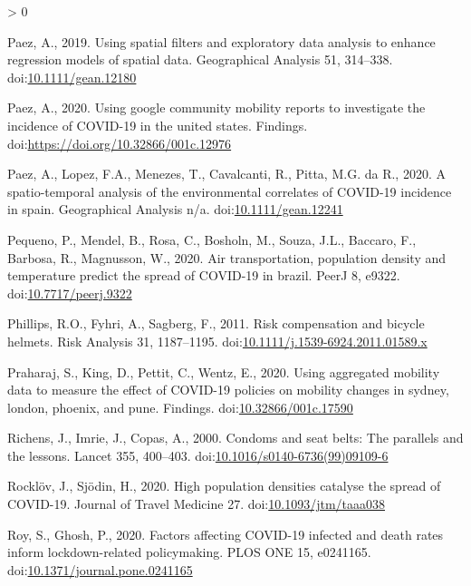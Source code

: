 \documentclass[]{elsarticle} %
\newlength{\cslhangindent}
\newenvironment{CSLReferences}[2] %
 {%
  \setlength{\parindent}{0pt}
  \ifodd #1 \everypar{\setlength{\hangindent}{\cslhangindent}}\ignorespaces\fi
  \ifnum #2 > 0
  \setlength{\parskip}{#2\baselineskip}
  \fi
 }%
 {}
\begin{document}
\begin{CSLReferences}{1}{0}
\leavevmode\hypertarget{ref-Paez2019using}{}%
Paez, A., 2019. Using spatial filters and exploratory data analysis to
enhance regression models of spatial data. Geographical Analysis 51,
314--338.
doi:\href{https://doi.org/10.1111/gean.12180}{10.1111/gean.12180}

\leavevmode\hypertarget{ref-Paez2020using}{}%
Paez, A., 2020. Using google community mobility reports to investigate
the incidence of COVID-19 in the united states. Findings.
doi:\url{https://doi.org/10.32866/001c.12976}

\leavevmode\hypertarget{ref-Paez2020spatio}{}%
Paez, A., Lopez, F.A., Menezes, T., Cavalcanti, R., Pitta, M.G. da R.,
2020. A spatio-temporal analysis of the environmental correlates of
COVID-19 incidence in spain. Geographical Analysis n/a.
doi:\href{https://doi.org/10.1111/gean.12241}{10.1111/gean.12241}

\leavevmode\hypertarget{ref-Pequeno2020air}{}%
Pequeno, P., Mendel, B., Rosa, C., Bosholn, M., Souza, J.L., Baccaro,
F., Barbosa, R., Magnusson, W., 2020. Air transportation, population
density and temperature predict the spread of COVID-19 in brazil. PeerJ
8, e9322.
doi:\href{https://doi.org/10.7717/peerj.9322}{10.7717/peerj.9322}

\leavevmode\hypertarget{ref-Phillips2011risk}{}%
Phillips, R.O., Fyhri, A., Sagberg, F., 2011. Risk compensation and
bicycle helmets. Risk Analysis 31, 1187--1195.
doi:\href{https://doi.org/10.1111/j.1539-6924.2011.01589.x}{10.1111/j.1539-6924.2011.01589.x}

\leavevmode\hypertarget{ref-Praharaj2020Using}{}%
Praharaj, S., King, D., Pettit, C., Wentz, E., 2020. Using aggregated
mobility data to measure the effect of COVID-19 policies on mobility
changes in sydney, london, phoenix, and pune. Findings.
doi:\href{https://doi.org/10.32866/001c.17590}{10.32866/001c.17590}

\leavevmode\hypertarget{ref-Richens2000condoms}{}%
Richens, J., Imrie, J., Copas, A., 2000. Condoms and seat belts: The
parallels and the lessons. Lancet 355, 400--403.
doi:\href{https://doi.org/10.1016/s0140-6736(99)09109-6}{10.1016/s0140-6736(99)09109-6}

\leavevmode\hypertarget{ref-Rocklov2020high}{}%
Rocklöv, J., Sjödin, H., 2020. High population densities catalyse the
spread of COVID-19. Journal of Travel Medicine 27.
doi:\href{https://doi.org/10.1093/jtm/taaa038}{10.1093/jtm/taaa038}

\leavevmode\hypertarget{ref-Roy2020factors}{}%
Roy, S., Ghosh, P., 2020. Factors affecting COVID-19 infected and death
rates inform lockdown-related policymaking. PLOS ONE 15, e0241165.
doi:\href{https://doi.org/10.1371/journal.pone.0241165}{10.1371/journal.pone.0241165}


\end{CSLReferences}
\end{document}
